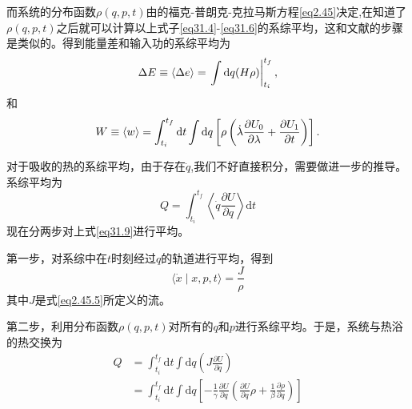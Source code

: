 而系统的分布函数$\rho (q,p,t)$由的福克-普朗克-克拉马斯方程\eqref{eq2.45}决定,在知道了$\rho (q,p,t)$之后就可以计算以上式子\eqref{eq31.4}-\eqref{eq31.6}的系综平均，这和文献\cite{Seifert2005,Shizume1995,Bizarro2011}的步骤是类似的。得到能量差和输入功的系综平均为
\begin{equation}
    \Delta E \equiv\langle\Delta e\rangle=\left.\int \mathrm{d} q (H \rho)\right|_{t_{i}} ^{t_{f}} ,
    \label{eq31.7}
\end{equation}
和
\begin{equation}
    W \equiv\langle w\rangle=\int_{t_{i}}^{t_{f}} \mathrm{d} t \int \mathrm{d} q \left[\rho \left( \dot{\lambda} \frac{\partial U_0}{\partial \lambda} + \frac{\partial U_1}{\partial t} \right) \right].
    \label{eq31.8}
\end{equation}

对于吸收的热的系综平均，由于存在$\dot{q}$,我们不好直接积分，需要做进一步的推导。系综平均为
\begin{equation}
    Q=\int_{t_i}^{t_f}\left\langle\dot{q} \frac{\partial U}{\partial q} \right\rangle \mathrm{d} t
    \label{eq31.9}
\end{equation}
现在分两步对上式\eqref{eq31.9}进行平均。

第一步，对系综中在$t$时刻经过$q$的轨道进行平均，得到
\begin{equation}
    \langle\dot{x} \mid x, p, t\rangle=\frac{J}{\rho}
    \label{eq31.10}
\end{equation}
其中$J$是式\eqref{eq2.45.5}所定义的流。

第二步，利用分布函数$\rho(q,p,t)$对所有的$q$和$p$进行系综平均。于是，系统与热浴的热交换为
\begin{equation}
    \begin{split}
        Q&=\int_{t_i}^{t_f} \mathrm{d} t \int \mathrm{d} q \left(J \frac{\partial U}{\partial q}\right)\\
         &=\int_{t_i}^{t_f} \mathrm{d} t \int \mathrm{d} q \left[-\frac{1}{\gamma}  \frac{\partial U}{\partial q} \left(\frac{\partial U}{\partial q} \rho+\frac{1}{\beta} \frac{\partial \rho}{\partial q}\right) \right ]
    \end{split}   
    \label{eq31.11}
\end{equation}


